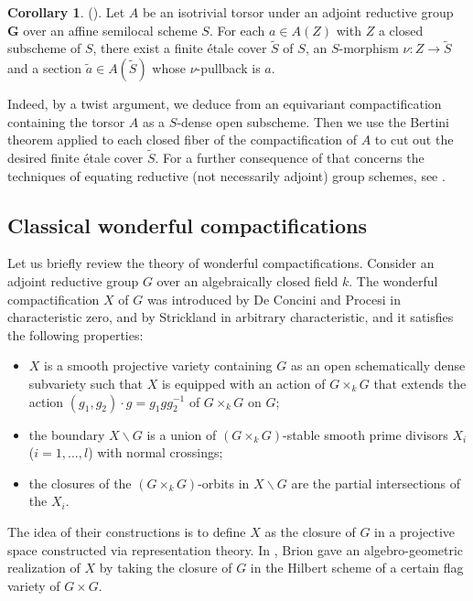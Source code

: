 \documentclass[11pt, reqno]{amsart}
\theoremstyle{plain}
\theoremstyle{definition}
\newtheorem{corollary}[theorem]{Corollary}
\begin{document}
\begin{corollary}
    (). Let $A$ be an isotrivial torsor under an adjoint reductive group $\mathbf{G}$ over an affine semilocal scheme $S$. For each $a\in A(Z)$ with $Z$ a closed subscheme of $S$, there exist a finite étale cover $\widetilde{S}$ of $S$, an $S$-morphism
    $\nu\colon Z\rightarrow\widetilde{S}$ and a section $\widetilde{a}\in A(\widetilde{S})$ whose $\nu$-pullback is $a$.
\end{corollary}

Indeed, by a twist argument, we deduce from  an equivariant compactification containing the torsor $A$ as a $S$-dense open subscheme. Then we use the Bertini theorem applied to each closed fiber of the compactification of $A$ to cut out the desired finite étale cover $\widetilde{S}$.
For a further consequence of  that concerns the techniques of equating reductive (not necessarily adjoint) group schemes, see .

\subsection{Classical wonderful compactifications}\label{introclassical}
Let us briefly review the theory of wonderful compactifications.
Consider an adjoint reductive group $G$ over an algebraically closed field $k$.  The wonderful compactification $X$ of $G$ was introduced by De Concini and Procesi \cite{completesymmetricvarieties} in characteristic zero, and by Strickland \cite{strickland} in arbitrary characteristic, and it satisfies the following properties:
\begin{itemize}
    \item $X$ is a smooth projective variety containing $G$ as an open schematically dense subvariety such that $X$ is equipped with an action of $G\times_k G$ that extends the action $(g_1,g_2)\cdot g= g_1 gg_2^{-1}$ of $G\times_k G$ on $G$;
    \item the boundary $X\backslash G$ is a union of $(G\times_k G)$-stable smooth prime divisors $X_i$ ($i=1,...,l$) with normal crossings;
    \item the closures of the $(G\times_k G)$-orbits in $X\backslash G$ are the partial intersections of the $X_i$.
\end{itemize}
The idea of their constructions is to define $X$ as the closure of $G$ in a projective space constructed via representation theory. In \cite{compactificationHilbertsch}, Brion gave an algebro-geometric realization of $X$ by taking the closure of $G$ in the Hilbert scheme of a certain flag variety of $G\times G$. 
\end{document}

